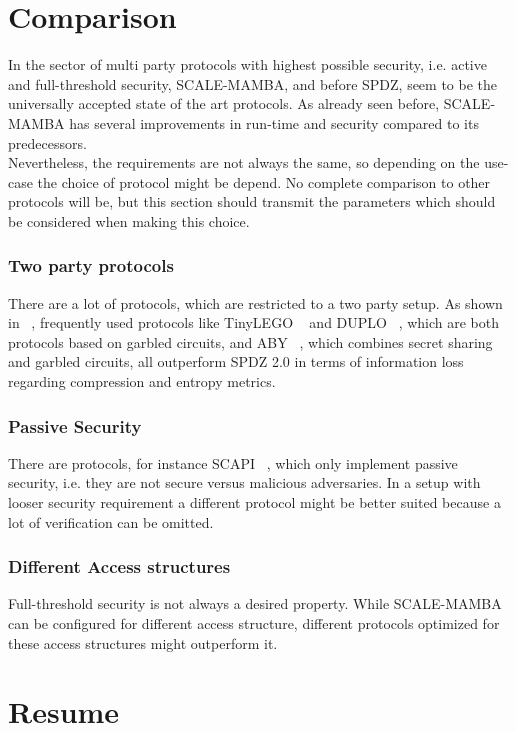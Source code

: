 \documentclass[english,runningheads,a4paper]{llncs}[2018/03/10]
\begin{document}
\section{Comparison}\label{sec:comparison}
In the sector of multi party protocols with highest possible security, i.e. active and full-threshold security, SCALE-MAMBA, and before SPDZ, seem to be the universally accepted state of the art protocols. As already seen before, SCALE-MAMBA has several improvements in run-time and security compared to its predecessors.\\
Nevertheless, the requirements are not always the same, so depending on the use-case the choice of protocol might be depend. No complete comparison to other protocols will be, but this section should transmit the parameters which should be considered when making this choice.\\
\subsubsection{Two party protocols} There are a lot of protocols, which are restricted to a two party setup. As shown in ~\cite{MPCCompression}, frequently used protocols like TinyLEGO ~\cite{TinyLego} and  DUPLO ~\cite{Duplo}, which are both protocols based on garbled circuits, and ABY ~\cite{Aby}, which combines secret sharing and garbled circuits, all outperform SPDZ 2.0 in terms of information loss regarding compression and entropy metrics.\\
\subsubsection{Passive Security}
There are protocols, for instance SCAPI ~\cite{SCAPI}, which only implement passive security, i.e. they are not secure versus malicious adversaries. In a setup with looser security requirement a different protocol might be better suited because a lot of verification can be omitted.\\
\subsubsection{Different Access structures}
Full-threshold security is not always a desired property. While SCALE-MAMBA can be configured for different access structure, different protocols optimized for these access structures might outperform it.\\

\section{Resume}\label{sec:outlook}
\end{document}
